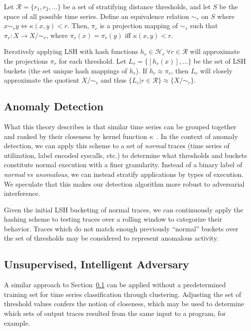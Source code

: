 \documentclass[a4paper]{article}
\begin{document}
Let $\mathcal{R} = \{r_1, r_2, \ldots\}$ be a set of stratifying distance thresholds, and let $S$ be the space of all possible time series.
Define an equivalence relation $\sim_r$ on $S$ where $x \sim_r y \Leftrightarrow \kappa(x,y) < r$.
Then, $\pi_r$ is a projection mapping of $\sim_r$ such that $\pi_r \colon X \rightarrow X/\sim_r$, where $\pi_r(x) = \pi_r(y)$ iff $\kappa(x,y) < r$.

Iteratively applying LSH with hash functions $h_r \in \mathcal{H}_r~\forall r\in \mathcal{R}$ will approximate the projections $\pi_r$ for each threshold.
Let $L_r = \{[h_r(x)], \ldots \}$ be the set of LSH buckets (the set unique hash mappings of $h_r$).
If $h_r \approx \pi_r$, then $L_r$ will closely approximate the quotient $X/\sim_r$ and thus $\{L_r | r \in \mathcal{R} \} \approx \{X/\sim_r\}$.

\subsection{Anomaly Detection}
\label{subsec:anomaly_detection}

What this theory describes is that similar time series can be grouped together and ranked by their closeness by kernel function $\kappa$~\cite{Hachiya13-NSH}.
In the context of anomaly detection, we can apply this scheme to a set of \textit{normal} traces (time series of utilization, label encoded syscalls, etc.) to determine what thresholds and buckets constitute normal execution with a finer granularity.
Instead of a binary label of \textit{normal} vs \textit{anomalous}, we can instead stratify applications by types of execution.
We speculate that this makes our detection algorithm more robust to adversarial interference.

Given the initial LSH bucketing of normal traces, we can continuously apply the hashing scheme to testing traces over a rolling window to categorize their behavior.
Traces which do not match enough previously ``normal'' buckets over the set of thresholds may be considered to represent anomalous activity.


\subsection{Unsupervised, Intelligent Adversary}

A similar approach to Section~\ref{subsec:anomaly_detection} can be applied without a predetermined training set for time series classification through clustering.
Adjusting the set of threshold values confers the notion of closeness, which may be used to determine which sets of output traces resulted from the same input to a program, for example.
\end{document}
